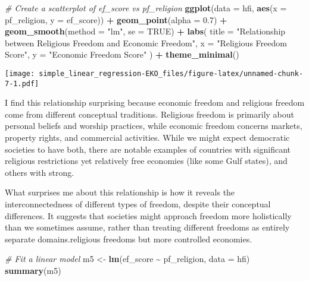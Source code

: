 \documentclass[
]{article}
\newenvironment{Shaded}{\begin{snugshade}}{\end{snugshade}}
\newcommand{\AttributeTok}[1]{\textcolor[rgb]{0.13,0.29,0.53}{#1}}
\newcommand{\CommentTok}[1]{\textcolor[rgb]{0.56,0.35,0.01}{\textit{#1}}}
\newcommand{\ConstantTok}[1]{\textcolor[rgb]{0.56,0.35,0.01}{#1}}
\newcommand{\FloatTok}[1]{\textcolor[rgb]{0.00,0.00,0.81}{#1}}
\newcommand{\FunctionTok}[1]{\textcolor[rgb]{0.13,0.29,0.53}{\textbf{#1}}}
\newcommand{\NormalTok}[1]{#1}
\newcommand{\OtherTok}[1]{\textcolor[rgb]{0.56,0.35,0.01}{#1}}
\newcommand{\SpecialCharTok}[1]{\textcolor[rgb]{0.81,0.36,0.00}{\textbf{#1}}}
\newcommand{\StringTok}[1]{\textcolor[rgb]{0.31,0.60,0.02}{#1}}
\begin{document}
\begin{Shaded}
\begin{Highlighting}[]
\CommentTok{\# Create a scatterplot of ef\_score vs pf\_religion}
\FunctionTok{ggplot}\NormalTok{(}\AttributeTok{data =}\NormalTok{ hfi, }\FunctionTok{aes}\NormalTok{(}\AttributeTok{x =}\NormalTok{ pf\_religion, }\AttributeTok{y =}\NormalTok{ ef\_score)) }\SpecialCharTok{+}
  \FunctionTok{geom\_point}\NormalTok{(}\AttributeTok{alpha =} \FloatTok{0.7}\NormalTok{) }\SpecialCharTok{+}
  \FunctionTok{geom\_smooth}\NormalTok{(}\AttributeTok{method =} \StringTok{"lm"}\NormalTok{, }\AttributeTok{se =} \ConstantTok{TRUE}\NormalTok{) }\SpecialCharTok{+}
  \FunctionTok{labs}\NormalTok{(}
    \AttributeTok{title =} \StringTok{"Relationship between Religious Freedom and Economic Freedom"}\NormalTok{,}
    \AttributeTok{x =} \StringTok{"Religious Freedom Score"}\NormalTok{,}
    \AttributeTok{y =} \StringTok{"Economic Freedom Score"}
\NormalTok{  ) }\SpecialCharTok{+}
  \FunctionTok{theme\_minimal}\NormalTok{()}
\end{Highlighting}
\end{Shaded}

\texttt{[image: simple\_linear\_regression-EKO\_files/figure-latex/unnamed-chunk-7-1.pdf]}

I find this relationship surprising because economic freedom and
religious freedom come from different conceptual traditions. Religious
freedom is primarily about personal beliefs and worship practices, while
economic freedom concerns markets, property rights, and commercial
activities. While we might expect democratic societies to have both,
there are notable examples of countries with significant religious
restrictions yet relatively free economies (like some Gulf states), and
others with strong.

What surprises me about this relationship is how it reveals the
interconnectedness of different types of freedom, despite their
conceptual differences. It suggests that societies might approach
freedom more holistically than we sometimes assume, rather than treating
different freedoms as entirely separate domains.religious freedoms but
more controlled economies.

\begin{Shaded}
\begin{Highlighting}[]
\CommentTok{\# Fit a linear model}
\NormalTok{m5 }\OtherTok{\textless{}{-}} \FunctionTok{lm}\NormalTok{(ef\_score }\SpecialCharTok{\textasciitilde{}}\NormalTok{ pf\_religion, }\AttributeTok{data =}\NormalTok{ hfi)}
\FunctionTok{summary}\NormalTok{(m5)}
\end{Highlighting}
\end{Shaded}
\end{document}
